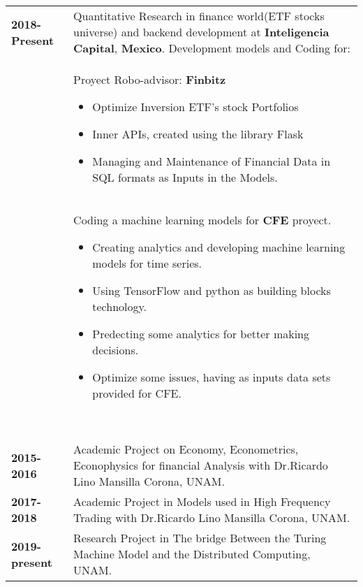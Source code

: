 \documentclass[twoside,a4paper,openright,10pt]{report}
\begin{document}
\begin{table}[ht]
\begin{tabular}{p{40mm} p{140mm}}
\textbf{2018-Present} & Quantitative Research in finance world(ETF stocks universe) and backend development at  \textbf{Inteligencia Capital}, \textbf{Mexico}. Development models and Coding for:\\
& \vspace{-2mm} Proyect Robo-advisor: \textbf{Finbitz} \begin{itemize}[noitemsep,nolistsep]
\item  Optimize Inversion ETF's stock Portfolios
\item Inner APIs, created using the library Flask
\item Managing and Maintenance of Financial Data in SQL formats as Inputs in the Models.
\vspace{-4mm}
\end{itemize}\\
& \vspace{-2mm}
Coding a machine learning models for \textbf{CFE} proyect.
\begin{itemize}
 \item Creating analytics and developing machine learning models for time series.
 \item Using TensorFlow and python as building blocks technology.
 \item Predecting some analytics for better making decisions.
 \item Optimize some issues, having as inputs data sets provided for CFE.
\end{itemize}

\\
\multicolumn{2}{c}{\cellcolor{black} \textcolor{white}{University Experience}}\\ \\

\textbf{2015- 2016} & Academic Project on Economy, Econometrics, Econophysics for financial Analysis with Dr.Ricardo Lino Mansilla Corona, UNAM.\\
\textbf{2017- 2018} & Academic Project in Models used in High Frequency Trading with Dr.Ricardo Lino Mansilla Corona, UNAM.\\
\textbf{2019-present} & Research Project in The bridge Between the Turing Machine Model and the Distributed Computing, UNAM.\\



\end{tabular}
\end{table}
\end{document}
